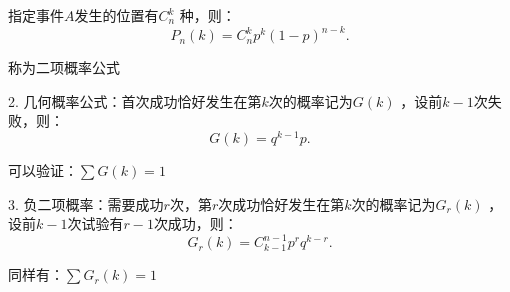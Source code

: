     指定事件$A$发生的位置有$C_{n}^{k}$ 种，则：\[
        P_n\left( k \right) =C_{n}^{k}p^{k}\left( 1-p \right) ^{n-k}
    .\] 

    称为二项概率公式

    2. 几何概率公式：首次成功恰好发生在第$k$次的概率记为$G\left( k \right) $ ，设前$k-1$次失败，则：\[
        G\left( k \right)= q^{k-1}p
    .\] 

    可以验证：$\sum G\left( k \right) =1$ 

    3. 负二项概率：需要成功$r$次，第$r$次成功恰好发生在第$k$次的概率记为$G_r\left( k \right) $ ，设前$k-1$次试验有$r-1$次成功，则：\[
        G_r\left( k \right) =C_{k-1}^{n-1}p^rq^{k-r}
    .\] 

    同样有：$\sum G_r\left( k \right) =1$
